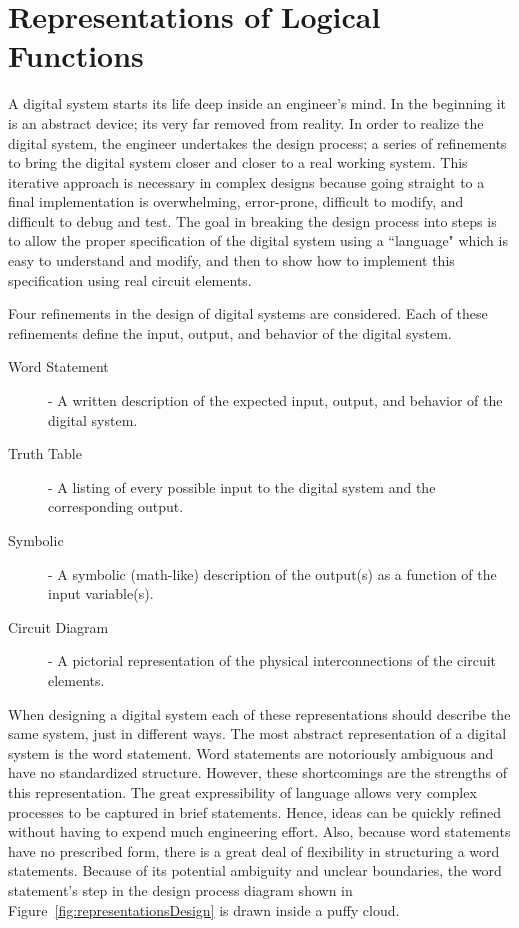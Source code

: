 \chapter{Representations of Logical Functions}
\label{chapter:Representations of Logical Functions}
\graphicspath{ {./chapter02/Fig} }

A digital system starts its life deep inside an engineer's mind.
In the beginning it is an abstract device; its very far removed
from reality.  In order to realize the digital system, the engineer
undertakes the design process; a series of refinements to bring
the digital system closer and closer to a real working system.  This
iterative approach is necessary in complex designs because going straight
to a final implementation is overwhelming, error-prone, difficult
to modify, and difficult to debug and test.  The goal in breaking the
design process into steps is to allow the proper specification of the
digital system using a ``language" which is easy to understand and modify,
and then to show how to implement this specification using real circuit
elements.

Four refinements in the design of digital systems are
considered.  Each of these refinements define the input, output, and
behavior of the digital system.

\begin{description}
    \item [Word Statement] - A written description of the expected
        input, output, and behavior of the digital system.
    \item [Truth Table] -  A listing of every possible input to the
        digital system and the corresponding output.
    \item [Symbolic] - A symbolic (math-like) description of the
        output(s) as a function of the input variable(s).
    \item [Circuit Diagram] - A pictorial representation of the
        physical interconnections of the circuit elements.
\end{description}

When designing a digital system each of these representations should
describe the same system, just in different ways.  The most abstract
representation of a digital system is the word statement.  Word
statements are notoriously ambiguous and have no standardized structure.
However, these shortcomings are the strengths of this representation. The great
expressibility of language allows very complex processes to be captured
in brief statements.  Hence, ideas can be quickly refined
without having to expend much engineering effort.  Also, because
word statements have no prescribed form, there is a great deal
of flexibility in structuring a word statements.  Because of its
potential ambiguity and unclear boundaries, the word statement's step
in the design process diagram shown in Figure~\ref{fig:representationsDesign} is
drawn inside a puffy cloud.

